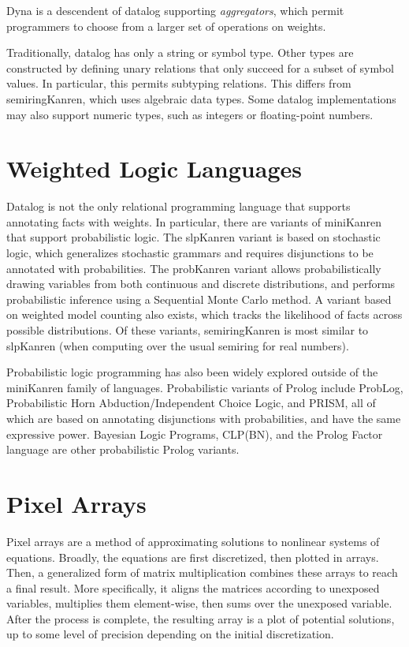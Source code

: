 \documentclass{report}
\theoremstyle{definition}
\begin{document}
Dyna\cite{francislandau2024} is a descendent of datalog supporting \emph{aggregators}, which permit programmers to choose from a larger set of operations on weights.

Traditionally, datalog has only a string or symbol type.
Other types are constructed by defining unary relations that only succeed for a subset of symbol values\cite{fruhwirth1991}.
In particular, this permits subtyping relations.
This differs from semiringKanren, which uses algebraic data types.
Some datalog implementations may also support numeric types, such as integers or floating-point numbers.

\section{Weighted Logic Languages}

Datalog is not the only relational programming language that supports annotating facts with weights.
In particular, there are variants of miniKanren that support probabilistic logic.
The slpKanren\cite{byrd2013} variant is based on stochastic logic, which generalizes stochastic grammars and requires disjunctions to be annotated with probabilities.
The probKanren\cite{zinkov2021} variant allows probabilistically drawing variables from both continuous and discrete distributions,
and performs probabilistic inference using a Sequential Monte Carlo method.
A variant based on weighted model counting\cite{donahue2022} also exists, which tracks the likelihood of facts across possible distributions.
Of these variants, semiringKanren is most similar to slpKanren (when computing over the usual semiring for real numbers).

Probabilistic logic programming has also been widely explored outside of the miniKanren family of languages\cite{riguzzi2022}.
Probabilistic variants of Prolog include ProbLog, Probabilistic Horn Abduction/Independent Choice Logic, and PRISM,
all of which are based on annotating disjunctions with probabilities, and have the same expressive power.
Bayesian Logic Programs, CLP(BN), and the Prolog Factor language are other probabilistic Prolog variants.

\section{Pixel Arrays}

Pixel arrays\cite{spivak2017} are a method of approximating solutions to nonlinear systems of equations.
Broadly, the equations are first discretized, then plotted in arrays.
Then, a generalized form of matrix multiplication combines these arrays to reach a final result.
More specifically, it aligns the matrices according to unexposed variables, multiplies them element-wise, then sums over the unexposed variable.
After the process is complete, the resulting array is a plot of potential solutions, up to some level of precision depending on the initial discretization.
\end{document}
